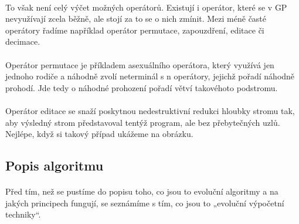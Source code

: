\documentclass[bc,male,java,dept460]{diploma}		%
\begin{document}
\paragraph*{}
To však není celý výčet možných operátorů. Existují i operátor, které se v GP nevyužívají zcela běžně, ale stojí za to se o nich zmínit. Mezi méně časté operátory řadíme například operátor permutace, zapouzdření, editace či decimace.
\paragraph*{}
Operátor permutace je příkladem asexuálního operátora, který využívá jen jednoho rodiče a náhodně zvolí neterminál s n operátory, jejichž pořadí náhodně prohodí. Jde tedy o náhodné prohození pořadí větví takovéhoto podstromu.
\paragraph*{}
Operátor editace se snaží poskytnou nedestruktivní redukci hloubky stromu tak, aby výsledný strom představoval tentýž program, ale bez přebytečných uzlů. Nejlépe, když si takový případ ukážeme na obrázku.


\subsection{Popis algoritmu}
\paragraph*{}
Před tím, než se pustíme do popisu toho, co jsou to evoluční algoritmy a na jakých principech fungují, se seznámíme s tím, co jsou to „evoluční výpočetní techniky“.
\end{document}
